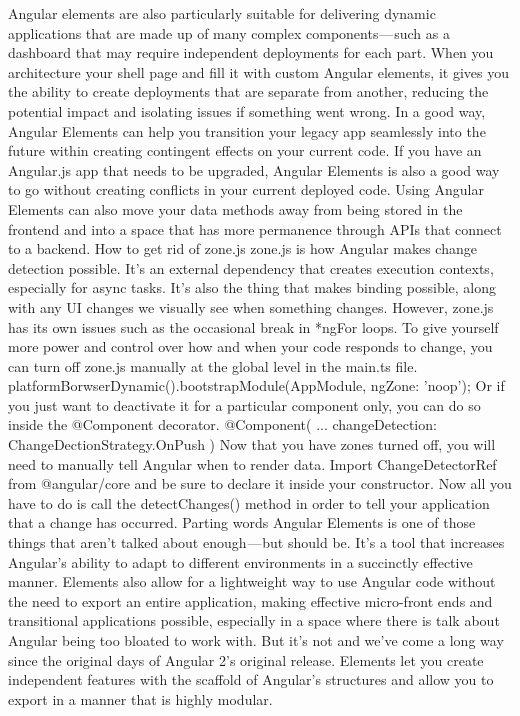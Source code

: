 Angular elements are also particularly suitable for delivering dynamic applications that are made up of many complex components — such as a dashboard that may require independent deployments for each part. When you architecture your shell page and fill it with custom Angular elements, it gives you the ability to create deployments that are separate from another, reducing the potential impact and isolating issues if something went wrong. 
In a good way, Angular Elements can help you transition your legacy app seamlessly into the future within creating contingent effects on your current code. If you have an Angular.js app that needs to be upgraded, Angular Elements is also a good way to go without creating conflicts in your current deployed code. 
Using Angular Elements can also move your data methods away from being stored in the frontend and into a space that has more permanence through APIs that connect to a backend. 
How to get rid of zone.js
zone.js is how Angular makes change detection possible. It’s an external dependency that creates execution contexts, especially for async tasks. It’s also the thing that makes binding possible, along with any UI changes we visually see when something changes.
However, zone.js has its own issues such as the occasional break in *ngFor loops. To give yourself more power and control over how and when your code responds to change, you can turn off zone.js manually at the global level in the main.ts file.
platformBorwserDynamic().bootstrapModule(AppModule, { ngZone: 'noop'});
Or if you just want to deactivate it for a particular component only, you can do so inside the @Component decorator. 
@Component({
...
changeDetection: ChangeDectionStrategy.OnPush
})
Now that you have zones turned off, you will need to manually tell Angular when to render data. Import ChangeDetectorRef from @angular/core and be sure to declare it inside your constructor. Now all you have to do is call the detectChanges() method in order to tell your application that a change has occurred. 
Parting words
Angular Elements is one of those things that aren’t talked about enough — but should be. It’s a tool that increases Angular’s ability to adapt to different environments in a succinctly effective manner. 
Elements also allow for a lightweight way to use Angular code without the need to export an entire application, making effective micro-front ends and transitional applications possible, especially in a space where there is talk about Angular being too bloated to work with. 
But it’s not and we’ve come a long way since the original days of Angular 2’s original release. Elements let you create independent features with the scaffold of Angular’s structures and allow you to export in a manner that is highly modular. 

